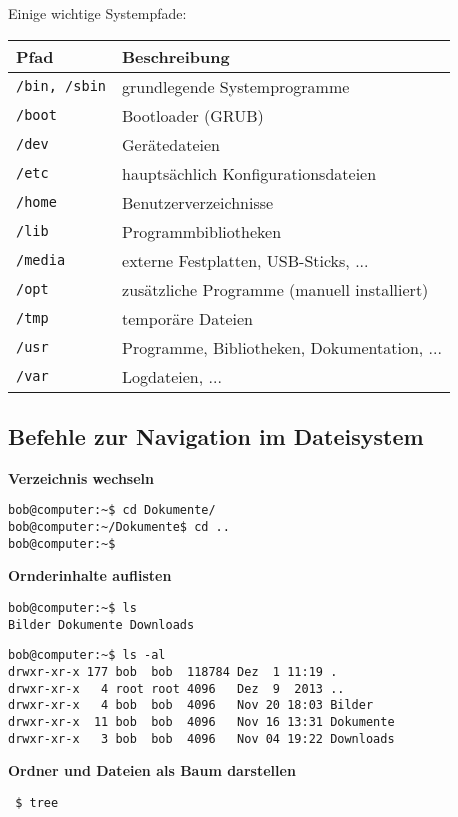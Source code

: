 Einige wichtige Systempfade:\par
\begin{tabularx}{1\textwidth}{|l|X|}
\hline
\textbf{Pfad} & \textbf{Beschreibung} \\
\hline
\lstinline|/bin, /sbin| & grundlegende Systemprogramme \\
\lstinline|/boot| & Bootloader (GRUB) \\
\lstinline|/dev| & Gerätedateien \\
\lstinline|/etc| & hauptsächlich Konfigurationsdateien \\
\lstinline|/home| & Benutzerverzeichnisse \\
\lstinline|/lib| & Programmbibliotheken \\
\lstinline|/media| & externe Festplatten, USB-Sticks, ... \\
\lstinline|/opt| & zusätzliche Programme (manuell installiert) \\
\lstinline|/tmp| & temporäre Dateien \\
\lstinline|/usr| & Programme, Bibliotheken, Dokumentation, ... \\
\lstinline|/var| & Logdateien, ... \\
\hline
\end{tabularx}


\subsection {Befehle zur Navigation im Dateisystem}

\textbf{Verzeichnis wechseln}
\begin{lstlisting}[style=terminal]
bob@computer:~$ cd Dokumente/
bob@computer:~/Dokumente$ cd ..
bob@computer:~$
\end{lstlisting}

\textbf{Ornderinhalte auflisten}
\begin{lstlisting}[style=terminal]
bob@computer:~$ ls
Bilder Dokumente Downloads
\end{lstlisting}

\begin{lstlisting}[style=terminal]
bob@computer:~$ ls -al
drwxr-xr-x 177 bob  bob  118784 Dez  1 11:19 .
drwxr-xr-x   4 root root 4096   Dez  9  2013 ..
drwxr-xr-x   4 bob  bob  4096   Nov 20 18:03 Bilder
drwxr-xr-x  11 bob  bob  4096   Nov 16 13:31 Dokumente
drwxr-xr-x   3 bob  bob  4096   Nov 04 19:22 Downloads
\end{lstlisting}

\textbf{Ordner und Dateien als Baum darstellen}
\begin{lstlisting}
 $ tree
\end{lstlisting}




